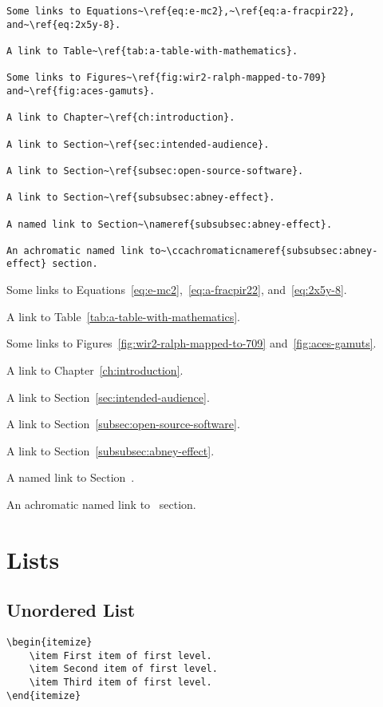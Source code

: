 \begin{lstlisting}[caption={Hyperlinks.}]
Some links to Equations~\ref{eq:e-mc2},~\ref{eq:a-fracpir22}, and~\ref{eq:2x5y-8}.

A link to Table~\ref{tab:a-table-with-mathematics}.

Some links to Figures~\ref{fig:wir2-ralph-mapped-to-709} and~\ref{fig:aces-gamuts}.

A link to Chapter~\ref{ch:introduction}.

A link to Section~\ref{sec:intended-audience}.

A link to Section~\ref{subsec:open-source-software}.

A link to Section~\ref{subsubsec:abney-effect}.

A named link to Section~\nameref{subsubsec:abney-effect}.

An achromatic named link to~\ccachromaticnameref{subsubsec:abney-effect} section.
\end{lstlisting}

Some links to Equations~\ref{eq:e-mc2},~\ref{eq:a-fracpir22}, and~\ref{eq:2x5y-8}.

A link to Table~\ref{tab:a-table-with-mathematics}.

Some links to Figures~\ref{fig:wir2-ralph-mapped-to-709} and~\ref{fig:aces-gamuts}.

A link to Chapter~\ref{ch:introduction}.

A link to Section~\ref{sec:intended-audience}.

A link to Section~\ref{subsec:open-source-software}.

A link to Section~\ref{subsubsec:abney-effect}.

A named link to Section~.

An achromatic named link to~ section.

\section*{Lists}%
\label{sec:lists}

\subsection*{Unordered List}%
\label{subsec:unordered-list}

\begin{lstlisting}[caption={An unordered list.}]
\begin{itemize}
    \item First item of first level.
    \item Second item of first level.
    \item Third item of first level.
\end{itemize}
\end{lstlisting}

